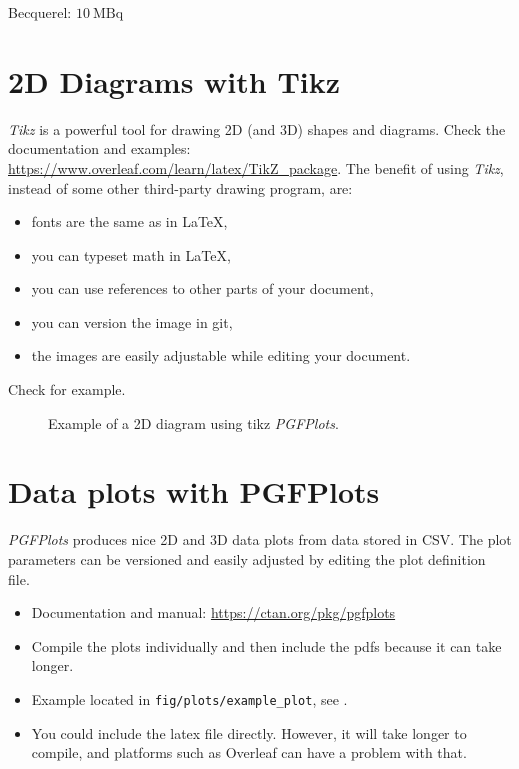 Becquerel: $ \SI{10}{\mega\becquerel} $

\section{2D Diagrams with Tikz}

\emph{Tikz} is a powerful tool for drawing 2D (and 3D) shapes and diagrams.
Check the documentation and examples: \url{https://www.overleaf.com/learn/latex/TikZ_package}.
The benefit of using \emph{Tikz}, instead of some other third-party drawing program, are:
\begin{itemize}
  \item fonts are the same as in LaTeX,
  \item you can typeset math in LaTeX,
  \item you can use references to other parts of your document,
  \item you can version the image in git,
  \item the images are easily adjustable while editing your document.
\end{itemize}
Check  for example.

\begin{figure}[!h]
  \centering

  \begin{adjustbox}{max totalsize={0.6\textwidth}{0.90\textheight}, center}
    
  \end{adjustbox}

  \caption{Example of a 2D diagram using tikz \emph{PGFPlots}.}
  \label{fig:pgfplots}
\end{figure}

\section{Data plots with PGFPlots}

\emph{PGFPlots} produces nice 2D and 3D data plots from data stored in CSV.
The plot parameters can be versioned and easily adjusted by editing the plot definition file.
\begin{itemize}
  \item Documentation and manual: \url{https://ctan.org/pkg/pgfplots}
  \item Compile the plots individually and then include the pdfs because it can take longer.
  \item Example located in \texttt{fig/plots/example\_plot}, see .
  \item You could include the latex file directly. However, it will take longer to compile, and platforms such as Overleaf can have a problem with that.
\end{itemize}

